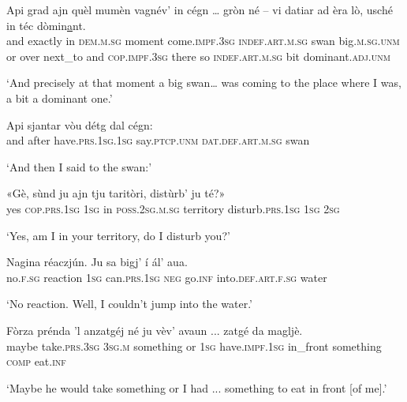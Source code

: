\begin{linenumbers}
\gll Api grad ajn quèl mumèn vagnév’ in cégn … gròn né – vi datiar ad èra lò, usché in téc dòmin\underline{a}nt.\\
and exactly in \textsc{dem.m.sg} moment come.\textsc{impf.3sg} \textsc{indef.art.m.sg} swan {} big.\textsc{m.sg.unm} or {} over next\_to and \textsc{cop.impf.3sg} there so \textsc{indef.art.m.sg} bit dominant.\textsc{adj.unm}\\
\end{linenumbers}
\medskip
\glt `And precisely at that moment a big swan… was coming to the place where I was, a bit a dominant one.'
\medskip

\begin{linenumbers}
\gll  Api sjantar vòu détg dal cégn:  \\
and after have.\textsc{prs.1sg.1sg} say.\textsc{ptcp.unm} \textsc{dat.def.art.m.sg} swan \\
\end{linenumbers}
\medskip
\glt `And then I said to the swan:'
\medskip

\begin{linenumbers}
\gll «Gè, sùnd ju ajn tju taritòri, distùrb’ ju té?»   \\
yes \textsc{cop.prs.1sg} \textsc{1sg} in \textsc{poss.2sg.m.sg} territory disturb.\textsc{prs.1sg} \textsc{1sg} \textsc{2sg} \\
\end{linenumbers}
\medskip
\glt `Yes, am I in your territory, do I disturb you?'
\medskip

\begin{linenumbers}
\gll  Nagina réaczjún. Ju sa bigj’ í ál’ aua.\\
no.\textsc{f.sg} reaction \textsc{1sg} can.\textsc{prs.1sg} \textsc{neg} go.\textsc{inf} into.\textsc{def.art.f.sg} water \\
\end{linenumbers}
\medskip
\glt `No reaction. Well, I couldn’t jump into the water.'
\medskip

\begin{linenumbers}
\gll Fòrza prénda ’l anzatgéj né ju vèv’ avaun ... zatgé da magljè.  \\
maybe take.\textsc{prs.3sg} \textsc{3sg.m} something or \textsc{1sg} have.\textsc{impf.1sg} in\_front {} something \textsc{comp} eat.\textsc{inf}\\
\end{linenumbers}
\medskip
\glt `Maybe he would take something or I had ... something to eat in front [of me].'
\medskip


